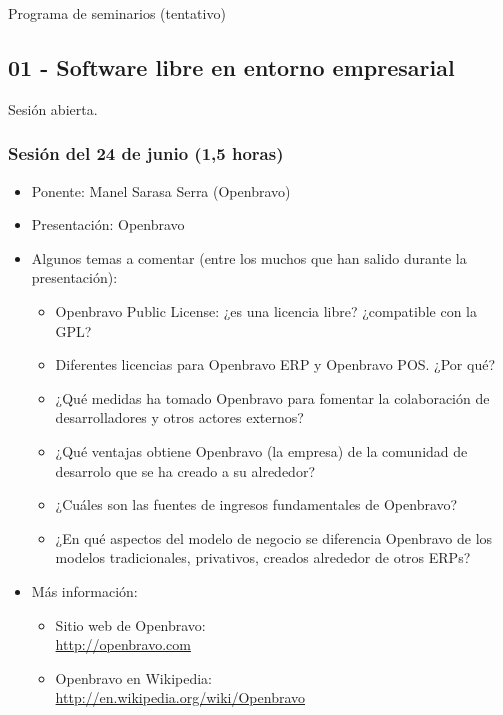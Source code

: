 \documentclass[a4paper,12pt]{article}
\begin{document}
Programa de seminarios (tentativo)

\subsection{01 - Software libre en entorno empresarial}

Sesión abierta.

\subsubsection{Sesión del 24 de junio (1,5 horas)}

\begin{itemize}
\item Ponente: Manel Sarasa Serra (Openbravo)
\item Presentación: Openbravo
\item Algunos temas a comentar (entre los muchos que han salido durante la presentación): 
  \begin{itemize}
  \item Openbravo Public License: ¿es una licencia libre? ¿compatible con la GPL?
  \item Diferentes licencias para Openbravo ERP y Openbravo POS. ¿Por qué?
  \item ¿Qué medidas ha tomado Openbravo para fomentar la colaboración de desarrolladores y otros actores externos?
  \item ¿Qué ventajas obtiene Openbravo (la empresa) de la comunidad de desarrolo que se ha creado a su alrededor?
  \item ¿Cuáles son las fuentes de ingresos fundamentales de Openbravo?
  \item ¿En qué aspectos del modelo de negocio se diferencia Openbravo de los modelos tradicionales, privativos, creados alrededor de otros ERPs?
  \end{itemize}
\item Más información:
  \begin{itemize}
  \item Sitio web de Openbravo: \\
    \url{http://openbravo.com}
  \item Openbravo en Wikipedia: \\
    \url{http://en.wikipedia.org/wiki/Openbravo}
  \end{itemize}
\end{itemize}
\end{document}
